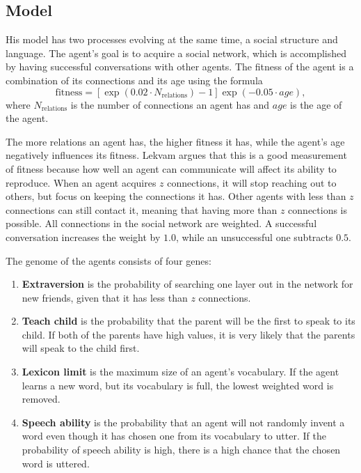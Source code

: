 \subsection{Model} 
His model has two processes evolving at the same time, a social structure and language. The agent's goal is to acquire a social network, which is accomplished by having successful conversations with other agents. The fitness of the agent is a combination of its connections and its age using the formula
\begin{equation}
    \mathrm{fitness} = [\exp(0.02 \cdot N_\mathrm{relations}) - 1] \exp(-0.05 \cdot \mathrm{\textit{age}}),
\end{equation}
where $N_\mathrm{relations}$ is the number of connections an agent has and $\mathrm{\textit{age}}$ is the age of the agent.

The more relations an agent has, the higher fitness it has, while the agent's age negatively influences its fitness. Lekvam argues that this is a good measurement of fitness because how well an agent can communicate will affect its ability to reproduce. When an agent acquires $z$ connections, it will stop reaching out to others, but focus on keeping the connections it has. Other agents with less than $z$ connections can still contact it, meaning that having more than $z$ connections is possible. All connections in the social network are weighted. A successful conversation increases the weight by $1.0$, while an unsuccessful one subtracts $0.5$. 

The genome of the agents consists of four genes:
\begin{enumerate}
    \item \textbf{Extraversion} is the probability of searching one layer out in the network for new friends, given that it has less than $z$ connections.
    
    \item \textbf{Teach child} is the probability that the parent will be the first to speak to its child. If both of the parents have high values, it is very likely that the parents will speak to the child first.
    
    \item \textbf{Lexicon limit} is the maximum size of an agent's vocabulary. If the agent learns a new word, but its vocabulary is full, the lowest weighted word is removed.
    
    \item \textbf{Speech ability} is the probability that an agent will not randomly invent a word even though it has chosen one from its vocabulary to utter. If the probability of speech ability is high, there is a high chance that the chosen word is uttered.
\end{enumerate}

